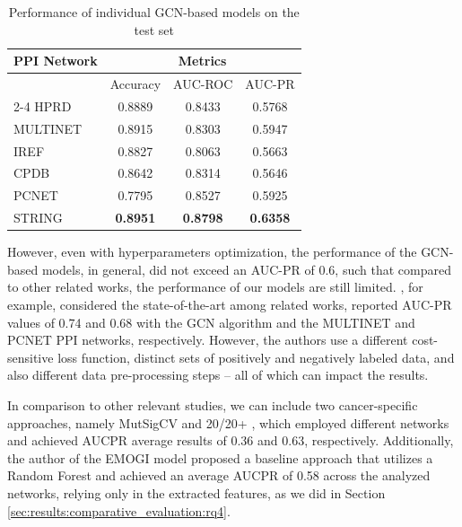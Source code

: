 \begin{table}[!ht]
\centering
\caption{Performance of individual GCN-based models on the test set\label{tab:perform_test_set}}
\begin{tabular}{lccc}
\hline
\multicolumn{1}{c}{PPI Network} & \multicolumn{3}{c}{Metrics}                         \\ \hline
                                & Accuracy        & AUC-ROC         & AUC-PR          \\ \cline{2-4} 
HPRD                            & 0.8889          & 0.8433          & 0.5768          \\
MULTINET                        & 0.8915          & 0.8303          & 0.5947          \\
IREF                            & 0.8827          & 0.8063          & 0.5663          \\
CPDB                            & 0.8642          & 0.8314          & 0.5646          \\
PCNET                           & 0.7795          & 0.8527          & 0.5925          \\
STRING                          & \textbf{0.8951} & \textbf{0.8798} & \textbf{0.6358} \\ \hline
\end{tabular}
\end{table}

However, even with hyperparameters optimization, the performance of the GCN-based models, in general, did not exceed an AUC-PR of 0.6, such that compared to other related works, the performance of our models are still limited.  \citet{schulte2021integration}, for example, considered the state-of-the-art among related works, reported AUC-PR values of 0.74 and 0.68 
with the GCN algorithm and the MULTINET and PCNET PPI networks, respectively. However, the authors use a different cost-sensitive loss function, distinct sets of positively and negatively labeled data, and also different data pre-processing steps -- all of which can impact the results.

In comparison to other relevant studies, we can include two cancer-specific approaches, namely MutSigCV \cite{lawrence2013mutational} and 20/20+ \cite{Tokheim2016}, which employed different networks and achieved AUCPR average results of 0.36 and 0.63, respectively. Additionally, the author of the EMOGI model \cite{schulte2021integration} proposed a baseline approach that utilizes a Random Forest and achieved an average AUCPR of 0.58 across the analyzed networks, relying only in the extracted features, as we did in Section \ref{sec:results:comparative_evaluation:rq4}.

